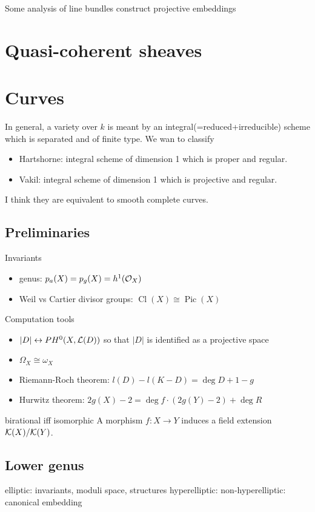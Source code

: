 \documentclass{../../large}
\newcommand{\Cl}{\operatorname{Cl}}
\newcommand{\Pic}{\operatorname{Pic}}
\begin{document}
Some analysis of line bundles construct projective embeddings


\chapter{Quasi-coherent sheaves}



\chapter{Curves}


In general, a variety over $k$ is meant by an integral(=reduced+irreducible) scheme which is separated and of finite type.
We wan to classify 
\begin{itemize}
\item Hartshorne: integral scheme of dimension 1 which is proper and regular.
\item Vakil: integral scheme of dimension 1 which is projective and regular.
\end{itemize}
I think they are equivalent to smooth complete curves.

\section{Preliminaries}
Invariants
\begin{itemize}
\item genus: $p_a(X)=p_g(X)=h^1(\mathcal{O}_X)$
\item Weil vs Cartier divisor groups: $\Cl(X)\cong\Pic(X)$
\end{itemize}

Computation tools
\begin{itemize}
\item $|D|\leftrightarrow PH^0(X,\mathcal{L}(D))$ so that $|D|$ is identified as a projective space
\item $\Omega_X\cong\omega_X$
\item Riemann-Roch theorem: $l(D)-l(K-D)=\deg D+1-g$
\item Hurwitz theorem: $2g(X)-2=\deg f\cdot(2g(Y)-2)+\deg R$
\end{itemize}


birational iff isomorphic
A morphism $f:X\to Y$ induces a field extension $\mathcal{K}(X)/\mathcal{K}(Y)$.

\section{Lower genus}
elliptic: invariants, moduli space, structures
hyperelliptic: 
non-hyperelliptic: canonical embedding
\end{document}
